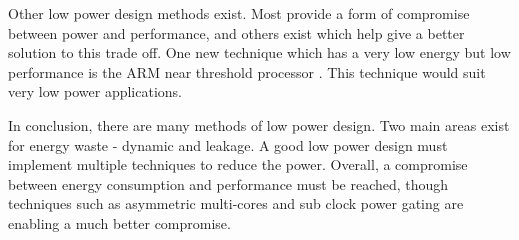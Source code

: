 Other low power design methods exist. 
Most provide a form of compromise between power and performance, and others exist which help give a better solution to this trade off. 
One new technique which has a very low energy but low performance is the ARM near threshold processor \cite{arm:nearthresh}. 
This technique would suit very low power applications.

In conclusion, there are many methods of low power design. 
Two main areas exist for energy waste - dynamic and leakage. 
A good low power design must implement multiple techniques to reduce the power. 
Overall, a compromise between energy consumption and performance must be reached, though techniques such as asymmetric multi-cores and sub clock power gating are enabling a much better compromise.

